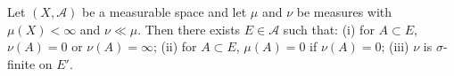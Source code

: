 Let $(X, \mathcal{A})$ be a measurable space and let $\mu$ and $\nu$ be measures with $\mu(X) < \infty$ and $\nu \ll \mu$. Then there exists $E \in \mathcal{A}$ such that: (i) for $A \subset E$, $\nu(A) = 0$ or $\nu(A) = \infty$; (ii) for $A \subset E$, $\mu(A) = 0$ if $\nu(A) = 0$; (iii) $\nu$ is $\sigma$-finite on $E'$.
